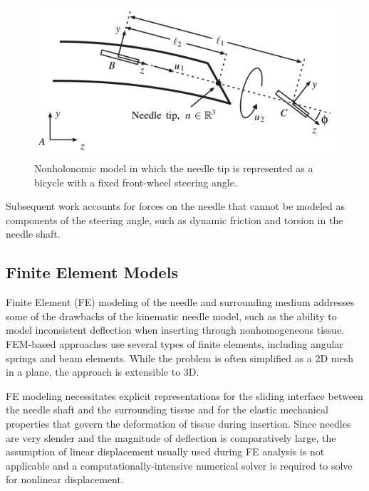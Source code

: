\begin{figure}[h]
\includegraphics[width=1.0\textwidth]{Fig/chap2/webster_nonholonomic_model.png}
\caption{Nonholonomic model in which the needle tip is represented as a bicycle with a fixed front-wheel steering angle\cite{webster_nonholonomic_2006}.}
\label{fig:webster_nonholonomic_model}
\end{figure}

Subsequent work accounts for forces on the needle that cannot be modeled as components of the steering angle, such as dynamic friction and torsion in the needle shaft\cite{reed_modeling_2009, swensen_torsional_2014}.

\subsection{Finite Element Models}
Finite Element (FE) modeling of the needle and surrounding medium addresses some of the drawbacks of the kinematic needle model, such as the ability to model inconsistent deflection when inserting through nonhomogeneous tissue\cite{goksel_modeling_2009}. FEM-based approaches use several types of finite elements, including angular springs and beam elements. While the problem is often simplified as a 2D mesh in a plane, the approach is extensible to 3D\cite{chentanez_interactive_2009}.

FE modeling necessitates explicit representations for the sliding interface between the needle shaft and the surrounding tissue and for the elastic mechanical properties that govern the deformation of tissue during insertion\cite{dehghan_comparison_2006}. Since needles are very slender and the magnitude of deflection is comparatively large, the assumption of linear displacement usually used during FE analysis is not applicable and a computationally-intensive numerical solver is required to solve for nonlinear displacement.

